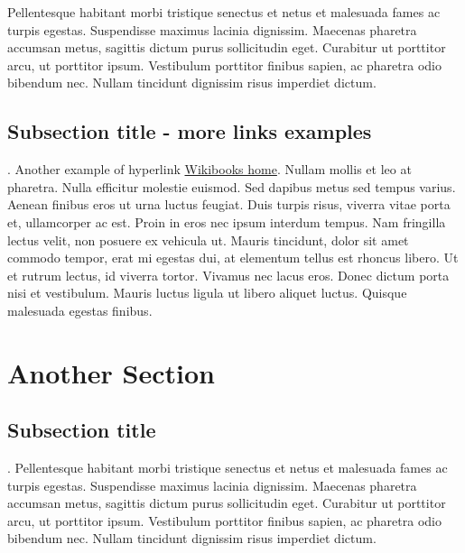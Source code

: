 Pellentesque habitant morbi tristique senectus et netus et malesuada fames ac turpis egestas. Suspendisse maximus lacinia dignissim. Maecenas pharetra accumsan metus, sagittis dictum purus sollicitudin eget. Curabitur ut porttitor arcu, ut porttitor ipsum. Vestibulum porttitor finibus sapien, ac pharetra odio bibendum nec. Nullam tincidunt dignissim risus imperdiet dictum.
\subsection{Subsection title - more links examples}.
Another example of hyperlink \href{http://www.wikibooks.org}{Wikibooks home}. Nullam mollis et leo at pharetra. Nulla efficitur molestie euismod. Sed dapibus metus sed tempus varius. Aenean finibus eros ut urna luctus feugiat. Duis turpis risus, viverra vitae porta et, ullamcorper ac est. Proin in eros nec ipsum interdum tempus. Nam fringilla lectus velit, non posuere ex vehicula ut. Mauris tincidunt, dolor sit amet commodo tempor, erat mi egestas dui, at elementum tellus est rhoncus libero. Ut et rutrum lectus, id viverra tortor. Vivamus nec lacus eros. Donec dictum porta nisi et vestibulum. Mauris luctus ligula ut libero aliquet luctus. Quisque malesuada egestas finibus.
 
\section{Another Section}
\subsection{Subsection title}.
Pellentesque habitant morbi tristique senectus et netus et malesuada fames ac turpis egestas. Suspendisse maximus lacinia dignissim. Maecenas pharetra accumsan metus, sagittis dictum purus sollicitudin eget. Curabitur ut porttitor arcu, ut porttitor ipsum. Vestibulum porttitor finibus sapien, ac pharetra odio bibendum nec. Nullam tincidunt dignissim risus imperdiet dictum.
\fi